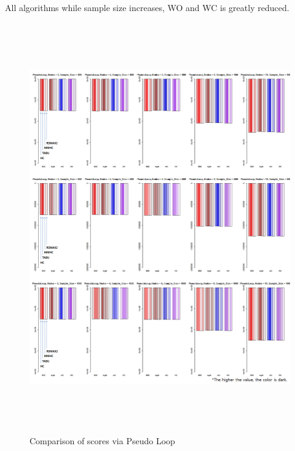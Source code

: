 All algorithms while sample size increases, WO and WC is greatly reduced.
	
	\begin{figure}[p]
	\centering
		\includegraphics[height=500pt]{04_PseudoLoop_Score}
		\caption{Comparison of scores via Pseudo Loop}
	\end{figure}	

